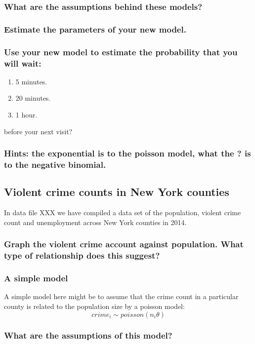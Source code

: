 \documentclass[11pt,fullpage]{book}
\begin{document}
\subsubsection{What are the assumptions behind these models?}
\subsubsection{Estimate the parameters of your new model.}
\subsubsection{Use your new model to estimate the probability that you will wait:}
\begin{enumerate}
\item 5 minutes.
\item 20 minutes.
\item 1 hour.
\end{enumerate}
before your next visit?

\subsubsection{Hints: the exponential is to the poisson model, what the ? is to the negative binomial.}

\subsection{Violent crime counts in New York counties}
In data file XXX we have compiled a data set of the population, violent crime count and unemployment across New York counties in 2014. 

\subsubsection{Graph the violent crime account against population. What type of relationship does this suggest?}
\subsubsection{A simple model}
A simple model here might be to assume that the crime count in a particular county is related to the population size by a poisson model:
\begin{equation}
crime_i \sim poisson(n_i\theta)
\end{equation}
\subsubsection{What are the assumptions of this model?}
\end{document}
